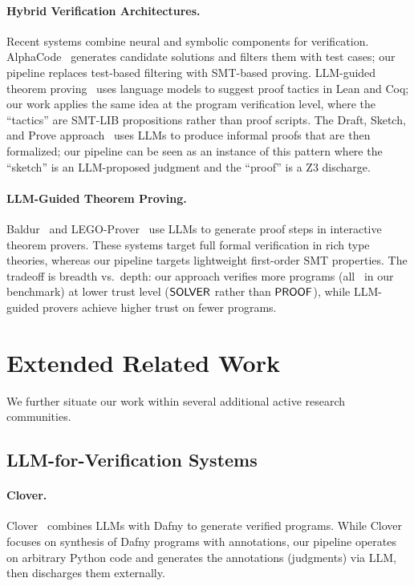 \documentclass[11pt]{article}
\begin{document}
\paragraph{Hybrid Verification Architectures.}
Recent systems combine neural and symbolic components for
verification.  AlphaCode~\cite{AlphaCode2022} generates candidate
solutions and filters them with test cases; our pipeline replaces
test-based filtering with SMT-based proving.
LLM-guided theorem proving~\cite{LLMProof2023} uses language models
to suggest proof tactics in Lean and Coq; our work applies the same
idea at the program verification level, where the ``tactics'' are
SMT-LIB propositions rather than proof scripts.  The Draft, Sketch,
and Prove approach~\cite{DSP2023} uses LLMs to produce informal proofs
that are then formalized; our pipeline can be seen as an instance of
this pattern where the ``sketch'' is an LLM-proposed judgment and the
``proof'' is a Z3 discharge.

\paragraph{LLM-Guided Theorem Proving.}
Baldur~\cite{Baldur2023} and LEGO-Prover~\cite{LEGOProver2023} use
LLMs to generate proof steps in interactive theorem provers.  These
systems target full formal verification in rich type theories, whereas
our pipeline targets lightweight first-order SMT properties.  The
tradeoff is breadth vs.\ depth: our approach verifies more programs
(all \ppLItotalPrograms\ in our benchmark) at lower trust level
($\mathsf{SOLVER}$ rather than $\mathsf{PROOF}$), while LLM-guided provers achieve
higher trust on fewer programs.

\section{Extended Related Work}\label{sec:related-ext}

We further situate our work within several additional active research
communities.

\subsection{LLM-for-Verification Systems}

\paragraph{Clover.}
Clover~\cite{Clover2023} combines LLMs with Dafny to generate verified
programs.  While Clover focuses on synthesis of Dafny programs with
annotations, our pipeline operates on arbitrary Python code and
generates the annotations (judgments) via LLM, then discharges them
externally.
\end{document}
